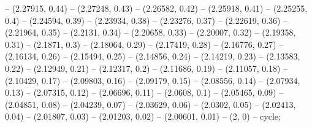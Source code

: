 -- (2.27915, 0.44)
-- (2.27248, 0.43)
-- (2.26582, 0.42)
-- (2.25918, 0.41)
-- (2.25255, 0.4)
-- (2.24594, 0.39)
-- (2.23934, 0.38)
-- (2.23276, 0.37)
-- (2.22619, 0.36)
-- (2.21964, 0.35)
-- (2.2131, 0.34)
-- (2.20658, 0.33)
-- (2.20007, 0.32)
-- (2.19358, 0.31)
-- (2.1871, 0.3)
-- (2.18064, 0.29)
-- (2.17419, 0.28)
-- (2.16776, 0.27)
-- (2.16134, 0.26)
-- (2.15494, 0.25)
-- (2.14856, 0.24)
-- (2.14219, 0.23)
-- (2.13583, 0.22)
-- (2.12949, 0.21)
-- (2.12317, 0.2)
-- (2.11686, 0.19)
-- (2.11057, 0.18)
-- (2.10429, 0.17)
-- (2.09803, 0.16)
-- (2.09179, 0.15)
-- (2.08556, 0.14)
-- (2.07934, 0.13)
-- (2.07315, 0.12)
-- (2.06696, 0.11)
-- (2.0608, 0.1)
-- (2.05465, 0.09)
-- (2.04851, 0.08)
-- (2.04239, 0.07)
-- (2.03629, 0.06)
-- (2.0302, 0.05)
-- (2.02413, 0.04)
-- (2.01807, 0.03)
-- (2.01203, 0.02)
-- (2.00601, 0.01)
-- (2, 0)
-- cycle;
